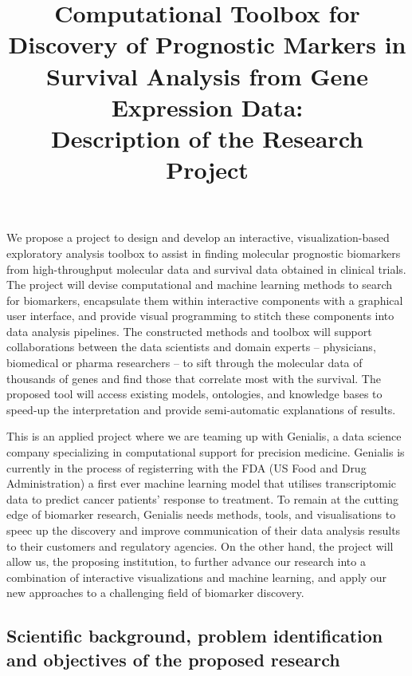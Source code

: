 \documentclass[11pt,a4paper]{article}
\begin{document}
\title{Computational Toolbox for Discovery of Prognostic Markers in Survival Analysis from Gene Expression Data: \\
Description of the Research Project}
\author{}
\date{}
\maketitle

We propose a project to design and develop an interactive, visualization-based exploratory analysis toolbox to assist in finding molecular prognostic biomarkers from high-throughput molecular data and survival data obtained in clinical trials. The project will devise computational and machine learning methods to search for biomarkers, encapsulate them within interactive components with a graphical user interface, and provide visual programming to stitch these components into data analysis pipelines. The constructed methods and toolbox will support collaborations between the data scientists and domain experts – physicians, biomedical or pharma researchers – to sift through the molecular data of thousands of genes and find those that correlate most with the survival. The proposed tool will access existing models, ontologies, and knowledge bases to speed-up the interpretation and provide semi-automatic explanations of results. 

This is an applied project where we are teaming up with Genialis, a data science company specializing in computational support for precision medicine. Genialis is currently in the process of registerring with the FDA (US Food and Drug Administration) a first ever machine learning model that utilises transcriptomic data to predict cancer patients' response to treatment. To remain at the cutting edge of biomarker research, Genialis needs methods, tools, and visualisations to speec up the discovery and improve communication of their data analysis results to their customers and regulatory agencies. On the other hand, the project will allow us, the proposing institution, to further advance our research into a combination of interactive visualizations and machine learning, and apply our new approaches to a challenging field of biomarker discovery.

\subsection{Scientific background, problem identification and objectives of the proposed research}
\end{document}

